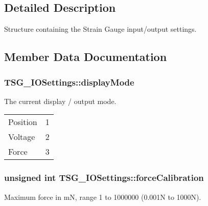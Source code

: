 \subsection{Detailed Description}
Structure containing the Strain Gauge input/output settings. 



\subsection{Member Data Documentation}
\subsubsection[{\texorpdfstring{display\+Mode}{displayMode}}]{ T\+S\+G\+\_\+\+I\+O\+Settings\+::display\+Mode}\hypertarget{struct_t_s_g___i_o_settings_a0d1d781fdd4e2229e79f6e004342b656}{}\label{struct_t_s_g___i_o_settings_a0d1d781fdd4e2229e79f6e004342b656}


The current display / output mode. \tabulinesep=1mm
\begin{longtabu} spread 0pt [c]{*2{|X[-1]}|}
\hline
Position&1 \\
Voltage&2 \\
Force&3 \\
\end{longtabu}


\subsubsection[{\texorpdfstring{force\+Calibration}{forceCalibration}}]{\setlength{\rightskip}{0pt plus 5cm}unsigned int T\+S\+G\+\_\+\+I\+O\+Settings\+::force\+Calibration}\hypertarget{struct_t_s_g___i_o_settings_a820d5bfa06774a0b62a8a3f38e5968a4}{}\label{struct_t_s_g___i_o_settings_a820d5bfa06774a0b62a8a3f38e5968a4}


Maximum force in mN, range 1 to 1000000 (0.\+001N to 1000N). 

